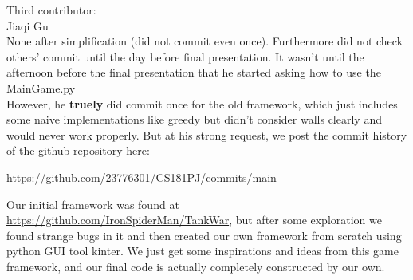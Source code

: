 \documentclass{article}
\begin{document}
Third contributor: \\
Jiaqi Gu\\
None after simplification (did not commit even once).  
Furthermore did not check others' commit until the day before final presentation.
It wasn't until the afternoon before the final presentation that he started asking how to use the MainGame.py \\
However, he \textbf{truely} did commit once for the old framework, which just includes some naive implementations like greedy but didn't consider 
walls clearly and would never work properly. But at his strong request, we post the commit history of the github repository here:

\href{https://github.com/23776301/CS181PJ/commits/main}{https://github.com/23776301/CS181PJ/commits/main}
\begin{ack}
	Our initial framework was found at \href{https://github.com/IronSpiderMan/TankWar}{https://github.com/IronSpiderMan/TankWar}, but after some exploration 
	we found strange bugs in it and then created our own framework from scratch using python GUI tool kinter.
	We just get some inspirations and ideas from this game framework, and
	our final code is actually completely constructed by our own.
\end{ack}
\end{document}
